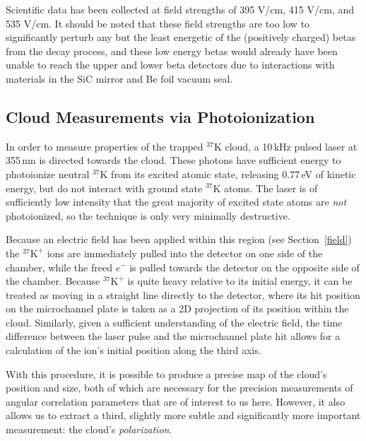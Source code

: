 
Scientific data has been collected at field strengths of 395 V/cm, 415 V/cm, and 535 V/cm.  It should be noted that these field strengths are too low to significantly perturb any but the least energetic of the (positively charged) betas from the decay process, and these low energy betas would already have been unable to reach the upper and lower beta detectors due to interactions with materials in the SiC mirror and Be foil vacuum seal.  

\subsection{Cloud Measurements via Photoionization}
\label{cloud}
\label{photoions}
In order to measure properties of the trapped $^{37}\textrm{K}$ cloud, a 10\,kHz pulsed laser at 355\,nm is directed towards the cloud.  These photons have sufficient energy to photoionize neutral $^{37}\textrm{K}$ from its excited atomic state, releasing 0.77\,eV of kinetic energy, but do not interact with ground state $^{37}\textrm{K}$ atoms.  The laser is of sufficiently low intensity that the great majority of excited state atoms are \emph{not} photoionized, so the technique is only very minimally destructive.  

Because an electric field has been applied within this region (see Section~\ref{field}) the $^{37}\textrm{K}^+$ ions are immediately pulled into the detector on one side of the chamber, while the freed $e^-$ is pulled towards the detector on the opposite side of the chamber.  Because  $^{37}\textrm{K}^+$ is quite heavy relative to its initial energy, it can be treated as moving in a straight line directly to the detector, where its hit position on the microchannel plate is taken as a 2D projection of its position within the cloud.  Similarly, given a sufficient understanding of the electric field, the time difference between the laser pulse and the microchannel plate hit allows for a calculation of the ion's initial position along the third axis.  

With this procedure, it is possible to produce a precise map of the cloud's position and size, both of which are necessary for the precision measurements of angular correlation parameters that are of interest to us here.  However, it also allows us to extract a third, slightly more subtle and significantly more important measurement:  the cloud's \emph{polarization}.

